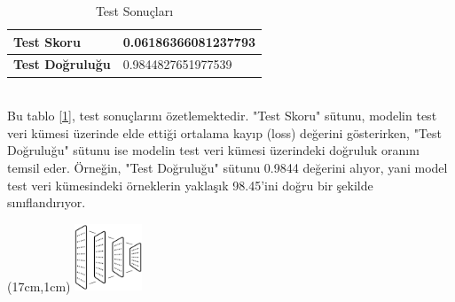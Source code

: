 \documentclass{article}
\begin{document}
\begin{table}[htbp]
\centering
\caption{Test Sonuçları}
\begin{tabular}{|l|l|}
\hline
\textbf{Test Skoru} & 0.06186366081237793 \\ \hline
\textbf{Test Doğruluğu} & 0.9844827651977539 \\ \hline
\end{tabular}
\label{tab:test_results}
\end{table}
\noindent \\[5pt] Bu tablo [\ref{tab:test_results}], test sonuçlarını özetlemektedir. "Test Skoru" sütunu, modelin test veri kümesi üzerinde elde ettiği ortalama kayıp (loss) değerini gösterirken, "Test Doğruluğu" sütunu ise modelin test veri kümesi üzerindeki doğruluk oranını temsil eder. Örneğin, "Test Doğruluğu" sütunu 0.9844 değerini alıyor, yani model test veri kümesindeki örneklerin yaklaşık 98.45'ini doğru bir şekilde sınıflandırıyor.
\newpage
\begin{textblock*}{5cm}(17cm,1cm) %
    \includegraphics[width=2cm]{image/Resim45.png} %
\end{textblock*}
\end{document}
